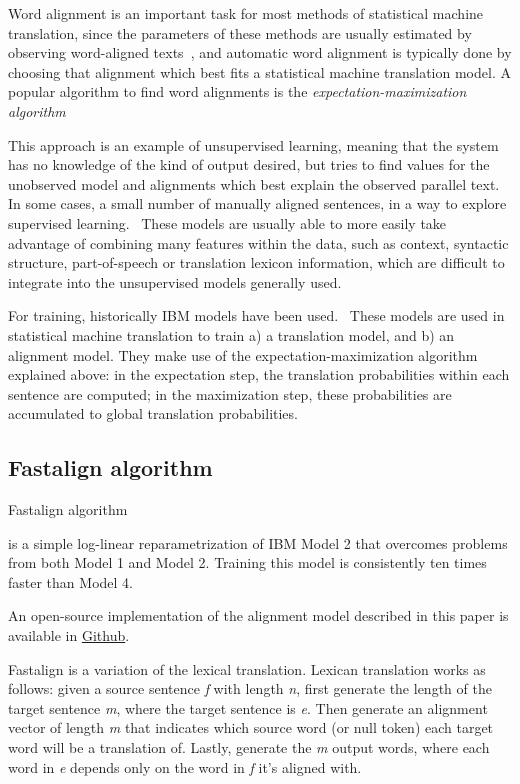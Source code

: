 Word alignment is an important task for most methods of statistical machine translation, since the parameters of these methods are usually estimated by observing word-aligned texts~\cite{brown1993mathematics}, and automatic word alignment is typically done by choosing that alignment which best fits a statistical machine translation model. A popular algorithm to find word alignments is the \emph{expectation-maximization algorithm}~\cite{och1999improved}

This approach is an example of unsupervised learning, meaning that the system has no knowledge of the kind of output desired, but tries to find values for the unobserved model and alignments which best explain the observed parallel text. In some cases, a small number of manually aligned sentences, in a way to explore supervised learning.~\cite{varga2007parallel} These models are usually able to more easily take advantage of combining many features within the data, such as context, syntactic structure, part-of-speech or translation lexicon information, which are difficult to integrate into the unsupervised models generally used.

For training, historically IBM models have been used.~\cite{koehn2009statistical} These models are used in statistical machine translation to train a) a translation model, and b) an alignment model. They make use of the expectation-maximization algorithm explained above: in the expectation step, the translation probabilities within each sentence are computed; in the maximization step, these probabilities are accumulated to global translation probabilities.

\subsection{Fastalign algorithm}

Fastalign algorithm~\cite{dyer-etal-2013-simple}

is a simple log-linear reparametrization of IBM Model 2 that overcomes problems from both Model 1 and Model 2. Training this model is consistently ten times faster than Model 4.

An open-source implementation of the alignment model described in this paper is available in \href{http://github.com/clab/fast align}{Github}.

Fastalign is a variation of the lexical translation. Lexican translation works as follows: given a source sentence \emph{f} with length \emph{n}, first generate the length of the target sentence \emph{m}, where the target sentence is \emph{e}. Then generate an alignment vector of length \emph{m} that indicates which source word (or null token) each target word will be a translation of. Lastly, generate the \emph{m} output words, where each word in \emph{e} depends only on the word in \emph{f} it's aligned with.

